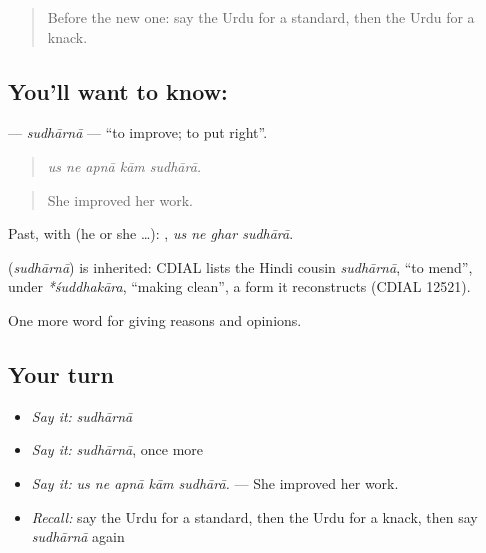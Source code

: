 \label{lesson:UR-C356-sudharna}



\begin{quote}
Before the new one: say the Urdu for a standard, then the Urdu for a knack.
\end{quote}

\subsection*{You'll want to know: }
\textbf{} — \emph{sudhārnā} — \textquotedblleft{}to improve; to put right\textquotedblright{}.

\begin{quote}
    
\end{quote}

\begin{quote}
\emph{us ne apnā kām sudhārā.}
\end{quote}

\begin{quote}
She improved her work.
\end{quote}

Past, with  (he or she …):    , \emph{us ne ghar sudhārā}.

\begin{cousinweb}
\textbf{} (\emph{sudhārnā}) is inherited: CDIAL lists the Hindi cousin \emph{sudhārnā}, \textquotedblleft{}to mend\textquotedblright{}, under \emph{*śuddhakāra}, \textquotedblleft{}making clean\textquotedblright{}, a form it reconstructs (CDIAL 12521).
\end{cousinweb}

\begin{grammarlens}[title={What you've built}]
One more word for giving reasons and opinions.
\end{grammarlens}

\subsection*{Your turn}
\begin{itemize}
\raggedright
  \item \emph{Say it:} \emph{sudhārnā}
  \item \emph{Say it:} \emph{sudhārnā}, once more
  \item \emph{Say it:} \emph{us ne apnā kām sudhārā.} — She improved her work.
  \item \emph{Recall:} say the Urdu for a standard, then the Urdu for a knack, then say \emph{sudhārnā} again
\end{itemize}


